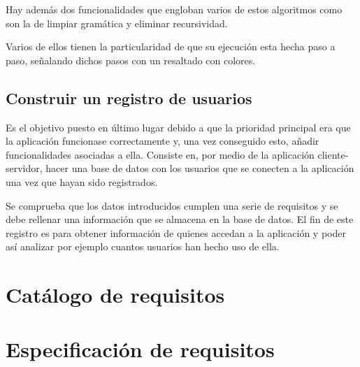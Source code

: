 Hay además dos funcionalidades que engloban varios de estos algoritmos como son la de limpiar gramática y eliminar recursividad.

Varios de ellos tienen la particularidad de que su ejecución esta hecha paso a paso, señalando dichos pasos con un resaltado con colores.

\subsection{Construir un registro de usuarios}

Es el objetivo puesto en último lugar debido a que la prioridad principal era que la aplicación funcionase correctamente y, una vez conseguido esto, añadir funcionalidades asociadas a ella. Consiste en, por medio de la aplicación cliente-servidor, hacer una base de datos con los usuarios que se conecten a la aplicación una vez que hayan sido registrados.

Se comprueba que los datos introducidos cumplen una serie de requisitos y se debe rellenar una información que se almacena en la base de datos.
El fin de este registro es para obtener información de quienes accedan a la aplicación y poder así analizar por ejemplo cuantos usuarios han hecho uso de ella.

\section{Catálogo de requisitos}

\section{Especificación de requisitos}


